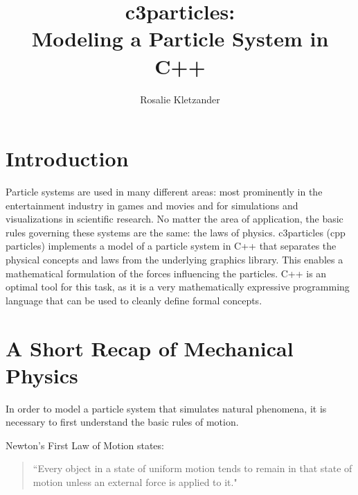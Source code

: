 \documentclass[runningheads,a4paper]{llncs}
\begin{document}
\mainmatter  %

\title{c3particles: \\ Modeling a Particle System in C++}


%
\author{Rosalie Kletzander}
%


\maketitle


\section{Introduction}
Particle systems are used in many different areas: most prominently in the entertainment industry in games and movies and for simulations and visualizations in scientific research. No matter the area of application, the basic rules governing these systems are the same: the laws of physics. c3particles (cpp particles) implements a model of a particle system in C++ that separates the physical concepts and laws from the underlying graphics library. This enables a mathematical formulation of the forces influencing the particles. C++ is an optimal tool for this task, as it is a very mathematically expressive programming language that can be used to cleanly define formal concepts.


\section{A Short Recap of Mechanical Physics}

In order to model a particle system that simulates natural phenomena, it is necessary to first understand the basic rules of motion.

Newton's First Law of Motion states:
\begin{quotation}
``Every object in a state of uniform motion tends to remain in that state of motion unless an external force is applied to it." \cite{Newton}
\end{quotation}
\end{document}
